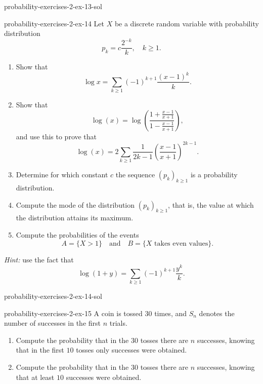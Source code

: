 \documentclass[preview]{standalone}
\begin{document}
\begin{snippetsolution}{probability-exercises-2-ex-13-sol}{}
    \todo
\end{snippetsolution}

\begin{snippetexercise}{probability-exercises-2-ex-14}{}
    Let \(X\) be a discrete random variable with probability distribution
    \[
        p_k = c\frac{2^{-k}}{k}, \quad k \geq 1.
    \]
    \begin{enumerate}
        \item Show that
        \[
            \log x = \sum_{k\geq 1}
            (-1)^{k+1}\frac{(x-1)^k}{k}.
        \]
        \item Show that
        \[
            \log(x)
            =
            \log\left(
                \frac{
                    1 + \frac{x-1}{x+1}
                }{
                    1 - \frac{x-1}{x+1}
                }
            \right),
        \]
        and use this to prove that
        \[
            \log(x)
            =
            2\sum_{k\geq 1}
            \frac{1}{2k-1}
            \left(
                \frac{x-1}{x+1}
            \right)^{2k-1}.
        \]
        \item Determine for which constant \(c\) the sequence
        \((p_k)_{k\geq 1}\) is a probability distribution.
        \item Compute the mode of the distribution \((p_k)_{k\geq 1}\), that is,
        the value at which the distribution attains its maximum.
        \item Compute the probabilities of the events
        \[
            A = \{X > 1\}
            \quad\text{and}\quad
            B = \{X \text{ takes even values}\}.
        \]
    \end{enumerate}
    \emph{Hint:} use the fact that
    \[
        \log(1+y)
        =
        \sum_{k\geq 1}
        (-1)^{k+1}\frac{y^k}{k}.
    \]
\end{snippetexercise}

\begin{snippetsolution}{probability-exercises-2-ex-14-sol}{}
    \todo
\end{snippetsolution}

\begin{snippetexercise}{probability-exercises-2-ex-15}{}
    A coin is tossed \(30\) times, and \(S_n\) denotes the number of successes in
    the first \(n\) trials.
    \begin{enumerate}
        \item Compute the probability that in the \(30\) tosses there are \(n\)
        successes, knowing that in the first \(10\) tosses only successes were
        obtained.
        \item Compute the probability that in the \(30\) tosses there are \(n\)
        successes, knowing that at least \(10\) successes were obtained.
    \end{enumerate}
\end{snippetexercise}
\end{document}
